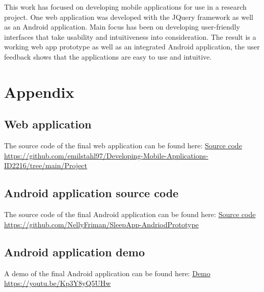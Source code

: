 \documentclass{article}
\begin{document}
This work has focused on developing mobile applications for use in a research project. One web application was developed with the JQuery framework as well as an Android application. Main focus has been on developing user-friendly interfaces that take usability and intuitiveness into consideration. 
The result is a working web app prototype as well as an integrated Android application, the user feedback shows that the applications are easy to use and intuitive. 

\clearpage
\section*{Appendix}

\subsection*{Web application}
The source code of the final web application can be found here: 
\href{https://github.com/emilstahl97/Developing-Mobile-Applications-ID2216/tree/main/Project}{Source code}
\\\url{https://github.com/emilstahl97/Developing-Mobile-Applications-ID2216/tree/main/Project}

\subsection*{Android application source code}

The source code of the final Android application can be found here: \href{https://github.com/NellyFriman/SleepApp-AndriodPrototype/tree/8304c413d850fc8d8b69a7e95ad304585589600d}{Source code} 
\\\url{https://github.com/NellyFriman/SleepApp-AndriodPrototype}

\subsection*{Android application demo}

A demo of the final Android application can be found here: \href{https://youtu.be/Kp3Y8yQ5UHw}{Demo}
\\\url{https://youtu.be/Kp3Y8yQ5UHw}

\clearpage
\printbibliography
\end{document}
